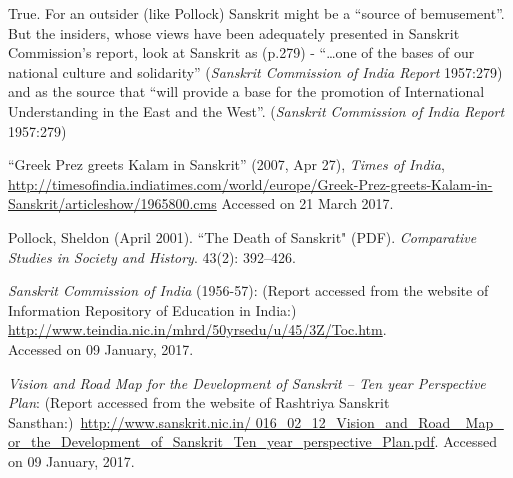 True. For an outsider (like Pollock) Sanskrit might be a “source of bemusement”. But the insiders, whose views have been adequately presented in Sanskrit Commission’s report, look at Sanskrit as (p.279) - “…one of the bases of our national culture and solidarity” ({\sl Sanskrit Commission of India Report} 1957:279) and as the source that “will provide a base for the promotion of International Understanding in the East and the West”. ({\sl Sanskrit Commission of India Report} 1957:279)

\begin{thebibliography}{99}
\itemsep=2pt
“Greek Prez greets Kalam in Sanskrit” (2007, Apr 27), {\sl Times of India}, \url{http://timesofindia.indiatimes.com/world/europe/Greek-Prez-greets-Kalam-in-Sanskrit/articleshow/1965800.cms}  Accessed on 21 March 2017. 

Pollock, Sheldon (April 2001). ``The Death of Sanskrit" (PDF). {\sl Comparative Studies in Society and History}. 43(2): 392--426.

{\sl Sanskrit Commission of India} (1956-57): (Report accessed from the website of Information Repository of Education in India:) \url{http://www.teindia.nic.in/mhrd/50yrsedu/u/45/3Z/Toc.htm}.\\ Accessed on 09 January, 2017.

{\sl Vision and Road Map for the Development of Sanskrit – Ten year Perspective Plan}: (Report accessed from the website 
of Rashtriya Sanskrit Sansthan:)~\url{http://www.sanskrit.nic.in/ 016_02_12_Vision_and_Road_ Map_ or_the_Development_of_Sanskrit_Ten_year_perspective_Plan.pdf}. Accessed on 09 January, 2017.
\end{thebibliography}
